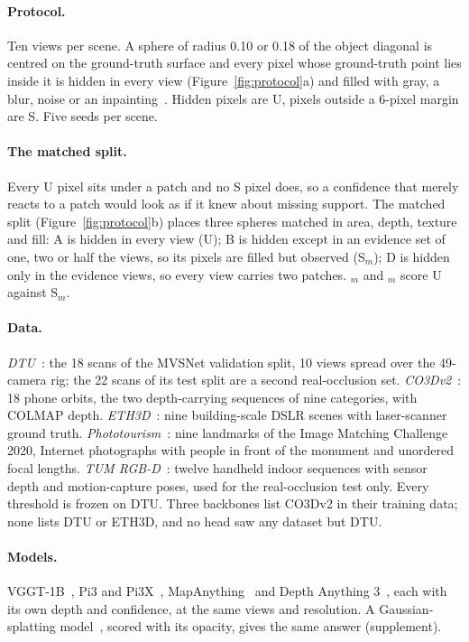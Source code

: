 \documentclass[10pt,twocolumn,letterpaper]{article}
\begin{document}
\paragraph{Protocol.}
Ten views per scene. A sphere of radius 0.10 or 0.18 of the object diagonal is centred on the ground-truth surface and every pixel whose ground-truth point lies inside it is hidden in every view (Figure~\ref{fig:protocol}a) and filled with gray, a blur, noise or an inpainting~\cite{telea}. Hidden pixels are U, pixels outside a 6-pixel margin are S. Five seeds per scene.

\paragraph{The matched split.}
Every U pixel sits under a patch and no S pixel does, so a confidence that merely reacts to a patch would look as if it knew about missing support. The matched split (Figure~\ref{fig:protocol}b) places three spheres matched in area, depth, texture and fill: A is hidden in every view (U); B is hidden except in an evidence set of one, two or half the views, so its pixels are filled but observed (S$_m$); D is hidden only in the evidence views, so every view carries two patches. \auroc$_m$ and \cur$_m$ score U against S$_m$.

\paragraph{Data.}
\emph{DTU}~\cite{dtu}: the 18 scans of the MVSNet validation split, 10 views spread over the 49-camera rig; the 22 scans of its test split are a second real-occlusion set. \emph{CO3Dv2}~\cite{co3d}: 18 phone orbits, the two depth-carrying sequences of nine categories, with COLMAP depth. \emph{ETH3D}~\cite{eth3d}: nine building-scale DSLR scenes with laser-scanner ground truth. \emph{Phototourism}~\cite{imc2020}: nine landmarks of the Image Matching Challenge 2020, Internet photographs with people in front of the monument and unordered focal lengths. \emph{TUM RGB-D}~\cite{tum}: twelve handheld indoor sequences with sensor depth and motion-capture poses, used for the real-occlusion test only. Every threshold is frozen on DTU. Three backbones list CO3Dv2 in their training data; none lists DTU or ETH3D, and no head saw any dataset but DTU.

\paragraph{Models.}
VGGT-1B~\cite{vggt}, Pi3 and Pi3X~\cite{pi3}, MapAnything~\cite{mapanything} and Depth Anything 3~\cite{da3}, each with its own depth and confidence, at the same views and resolution. A Gaussian-splatting model~\cite{anysplat}, scored with its opacity, gives the same answer (supplement).
\end{document}
